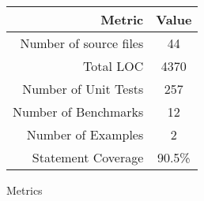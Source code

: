 \begin{figure}[H]
    \centering
    \small
    \begin{tabular}{r c}
        \toprule
        \textbf{Metric} & \textbf{Value} \\
        \midrule
        Number of source files         & 44 \\
        Total LOC                      & 4370 \\
        Number of Unit Tests           & 257 \\
        Number of Benchmarks           & 12 \\
        Number of Examples             & 2 \\
        Statement Coverage             & 90.5\% \\
        \bottomrule
    \end{tabular}
    \caption{Metrics}\label{fig:test_metrics}
\end{figure}